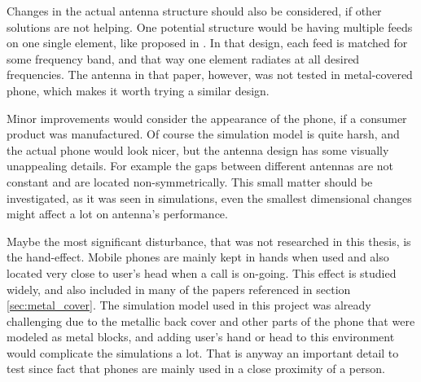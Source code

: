 Changes in the actual antenna structure should also be considered, if other solutions are not helping. One potential structure would be having multiple feeds on one single element, like proposed in \cite{valkonen_multifeed}. In that design, each feed is matched for some frequency band, and that way one element radiates at all desired frequencies. The antenna in that paper, however, was not tested in metal-covered phone, which makes it worth trying a similar design.

Minor improvements would consider the appearance of the phone, if a consumer product was manufactured. Of course the simulation model is quite harsh, and the actual phone would look nicer, but the antenna design has some visually unappealing details. For example the gaps between different antennas are not constant and are located non-symmetrically. This small matter should be investigated, as it was seen in simulations, even the smallest dimensional changes might affect a lot on antenna's performance.

Maybe the most significant disturbance, that was not researched in this thesis, is the hand-effect. Mobile phones are mainly kept in hands when used and also located very close to user's head when a call is on-going. This effect is studied widely, and also included in many of the papers referenced in section \ref{sec:metal_cover}. The simulation model used in this project was already challenging due to the metallic back cover and other parts of the phone that were modeled as metal blocks, and adding user's hand or head to this environment would complicate the simulations a lot. That is anyway an important detail to test since fact that phones are mainly used in a close proximity of a person.


\clearpage